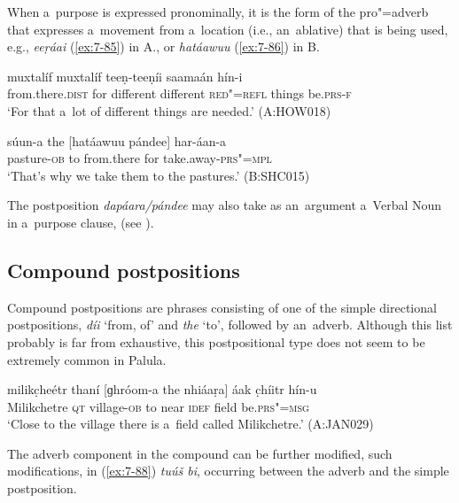 When a~purpose is expressed pronominally, it is the form of the pro"=adverb that expresses a~movement from a~location (i.e., an~ablative) that is being used, e.g., \textit{eeṛáai} (\ref{ex:7-85}) in A., or \textit{hatáawuu} (\ref{ex:7-86}) in B.

\begin{exe}
\ex
\label{ex:7-85}
 muxtalíf muxtalíf teeṇ-teeṇíi saamaán hín-i \\
from.there.\textsc{dist} for different different \textsc{red"=refl}  things be.\textsc{prs-f}  \\
\glt `For that a~lot of different things are needed.' (A:HOW018)
\end{exe}
\begin{exe}
\ex
\label{ex:7-86}
\gll súun-a the [hatáawuu pándee] har-áan-a \\
pasture-\textsc{ob} to from.there for take.away-\textsc{prs"=mpl} \\
\glt `That's why we take them to the pastures.' (B:SHC015)
\end{exe}

The postposition \textit{dapáara/pándee} may also take as an~argument a~Verbal Noun in a~purpose clause, (see ).


\subsection{Compound postpositions}
\label{subsec:7-2-3}

Compound postpositions are phrases consisting of one of the simple directional postpositions, \textit{díi} `from, of' and \textit{the} `to', followed by an~adverb. Although this list probably is far from exhaustive, this postpositional type does not seem to be extremely common in Palula. 


\begin{exe}
\ex
\label{ex:7-87}
\gll milikc̣heétr thaní [ɡhróom-a the nhiáaṛa] áak c̣híitr hín-u \\
Milikchetre \textsc{qt} village-\textsc{ob} to near \textsc{idef} field be.\textsc{prs"=msg} \\
\glt `Close to the village there is a~field called Milikchetre.' (A:JAN029)
\end{exe}

The adverb component in the compound can be further modified, such modifications, in (\ref{ex:7-88}) \textit{tuúš bi}, occurring between the adverb and the simple postposition.


